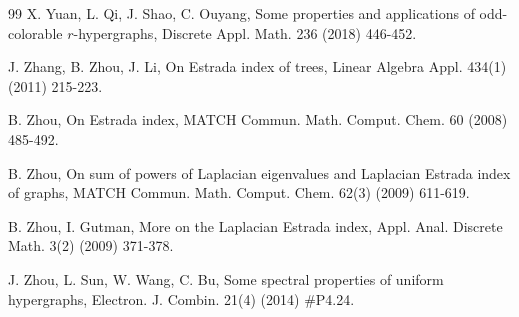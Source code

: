 \documentclass[11pt]{article}
\begin{document}
\begin{thebibliography}{99}
 X. Yuan, L. Qi, J. Shao, C. Ouyang, Some properties and applications of odd-colorable $r$-hypergraphs, Discrete Appl. Math. 236 (2018) 446-452.

 J. Zhang, B. Zhou, J. Li, On Estrada index of trees, Linear Algebra Appl. 434(1) (2011) 215-223.

 B. Zhou, On Estrada index, MATCH Commun. Math. Comput. Chem. 60 (2008) 485-492.

 B. Zhou, On sum of powers of Laplacian eigenvalues and Laplacian Estrada index of graphs, MATCH Commun. Math. Comput. Chem. 62(3) (2009) 611-619.

 B. Zhou, I. Gutman, More on the Laplacian Estrada index, Appl. Anal. Discrete Math. 3(2) (2009) 371-378.

 J. Zhou, L. Sun, W. Wang, C. Bu, Some spectral properties of uniform hypergraphs, Electron. J. Combin. 21(4) (2014) \#P4.24.

\end{thebibliography}
\end{document}
